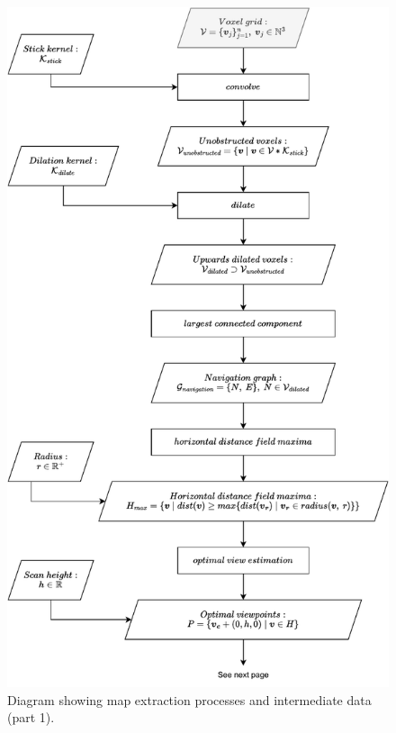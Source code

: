 \begin{figure}[p]
    \centering
    \includegraphics*[width=.8\textwidth]{./fig/flowchart_complete-Map extract.drawio.pdf}
    \caption{Diagram showing map extraction processes and intermediate data (part 1).}
    \label{fig:map_extract_steps}
\end{figure}

